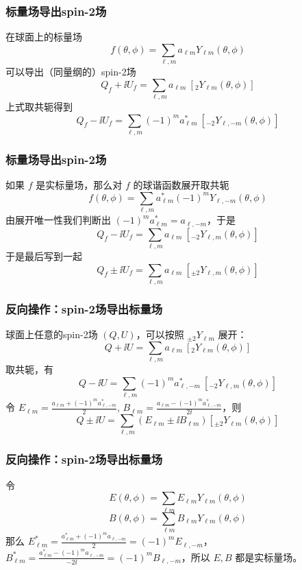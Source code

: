 \documentclass[CJK,13pt]{beamer}
\begin{document}

    \begin{frame}
    \frametitle{标量场导出spin-2场}
    在球面上的标量场
    $$ f(\theta,\phi) = \sum_{\ell, m}a_{\ell m}Y_{\ell m}(\theta,\phi)$$
    可以导出（同量纲的）spin-2场
    $$ Q_f + \ii U_f = \sum_{\ell, m}a_{\ell m}\ \left[_{2}Y_{\ell m}(\theta,\phi)\right]$$
    上式取共轭得到
    $$ Q_f - \ii U_f = \sum_{\ell, m}(-1)^m a_{\ell m}^*\ \left[_{-2}Y_{\ell,-m}(\theta,\phi)\right]$$    
  \end{frame}

    \begin{frame}
      \frametitle{标量场导出spin-2场}      
    如果 $f$ 是实标量场，那么对 $f$ 的球谐函数展开取共轭
    $$ f(\theta,\phi) = \sum_{\ell, m}a_{\ell m}^*(-1)^m Y_{\ell,-m}(\theta,\phi)$$
    由展开唯一性我们判断出 $(-1)^ma_{\ell m}^* = a_{\ell, -m}$，于是
    $$ Q_f - \ii U_f = \sum_{\ell, m} a_{\ell m}\ \left[_{-2}Y_{\ell,m}(\theta,\phi)\right]$$
    于是最后写到一起
    $$Q_f\pm \ii U_f = \sum_{\ell, m} a_{\ell m}\ \left[_{\pm 2}Y_{\ell,m}(\theta,\phi)\right]$$
  \end{frame}


  \begin{frame}
    \frametitle{反向操作：spin-2场导出标量场}
    球面上任意的spin-2场 $(Q, U)$，可以按照 $_{\pm 2}Y_{\ell m}$ 展开：
    $$ Q + \ii U = \sum_{\ell, m}a_{\ell m}\ \left[_{2}Y_{\ell m}(\theta,\phi)\right]$$
    取共轭，有
    $$ Q - \ii U = \sum_{\ell, m}(-1)^m a_{\ell, -m}^*\ \left[_{-2}Y_{\ell ,m}(\theta,\phi)\right]$$    
    令 $E_{\ell m} = \frac{a_{\ell m}+(-1)^m a_{\ell, -m}^*}{2}$, $ B_{\ell m} = \frac{a_{\ell m}-(-1)^m a_{\ell, -m}^*}{2\ii}$，则
    $$ Q\pm \ii U = \sum_{\ell, m} (E_{\ell m}\pm \ii B_{\ell m})\left[_{\pm 2}Y_{\ell m}(\theta,\phi)\right]$$
  \end{frame}
  
  \begin{frame}
    \frametitle{反向操作：spin-2场导出标量场}    
    令
    $$ E(\theta,\phi) = \sum_{\ell m} E_{\ell m} Y_{\ell m}(\theta,\phi)$$
    $$ B(\theta,\phi) = \sum_{\ell m} B_{\ell m} Y_{\ell m}(\theta,\phi)$$
    那么 $E_{\ell m}^* = \frac{a^*_{\ell m}+(-1)^m a_{\ell, -m}}{2} = (-1)^m E_{\ell, -m}$，$B_{\ell m}^* =  \frac{a_{\ell m}^*-(-1)^m a_{\ell, -m}}{-2\ii} = (-1)^m B_{\ell, -m}$，所以 $E, B$ 都是实标量场。

    \skiplines
    
  \end{frame}
\end{document}
